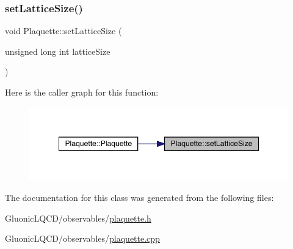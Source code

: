 \subsubsection{\texorpdfstring{setLatticeSize()}{setLatticeSize()}}
{\footnotesize\ttfamily void Plaquette\+::set\+Lattice\+Size (\begin{DoxyParamCaption}\item[{unsigned long int}]{lattice\+Size }\end{DoxyParamCaption})}

Here is the caller graph for this function\+:\nopagebreak
\begin{figure}[H]
\begin{center}
\leavevmode
\includegraphics[width=348pt]{class_plaquette_a011e1ca450fb40273ec8efa6d094c279_icgraph}
\end{center}
\end{figure}


The documentation for this class was generated from the following files\+:\begin{DoxyCompactItemize}
\item 
Gluonic\+L\+Q\+C\+D/observables/\mbox{\hyperlink{plaquette_8h}{plaquette.\+h}}\item 
Gluonic\+L\+Q\+C\+D/observables/\mbox{\hyperlink{plaquette_8cpp}{plaquette.\+cpp}}\end{DoxyCompactItemize}
